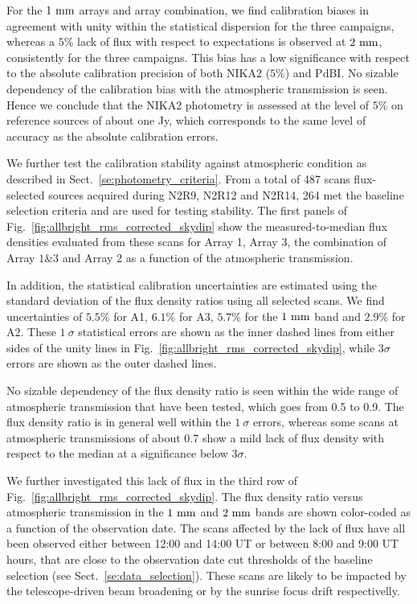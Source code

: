 For the $1~\rm{mm}$ arrays and array combination, we find calibration
biases in agreement with unity within the statistical dispersion for
the three campaigns, whereas a $5\%$ lack of flux with respect to
expectations is observed at $2~\rm{mm}$, consistently for the three
campaigns. This bias has a low significance with respect to the
absolute calibration precision of both NIKA2 ($5\%$) and PdBI.
No sizable dependency of the calibration bias with the
atmospheric transmission is seen. Hence we conclude that the NIKA2
photometry is assessed at the level of $5\%$ on reference sources of
about one Jy, which corresponds to the same level of accuracy as the
absolute calibration errors.   

We further test the calibration
stability against atmospheric condition as described in
Sect.~\ref{se:photometry_criteria}. From a total of 487 scans
flux-selected sources acquired during N2R9, N2R12 and N2R14, 264 met
the baseline selection criteria and are used for testing stability.
The first panels of Fig.~\ref{fig:allbright_rms_corrected_skydip} show the
measured-to-median flux densities evaluated from these scans for Array
1, Array 3, the combination of Array $1\&3$ and Array 2 as a function of the
atmospheric transmission.

In addition, the statistical calibration uncertainties are
estimated using the standard deviation of the flux density ratios
using all selected scans. We find uncertainties of $5.5\%$ for A1,
$6.1\%$ for A3, $5.7\%$ for the $1~\rm{mm}$ band and $2.9\%$ for A2.
These $1~\sigma$ statistical
errors are shown as the inner dashed lines from either sides of the
unity lines in Fig.~\ref{fig:allbright_rms_corrected_skydip}, while
$3\sigma$ errors are shown as the outer dashed lines.

No sizable dependency of the flux density ratio is seen within the
wide range of atmospheric transmission that have been tested, which goes
from 0.5 to 0.9. 
The flux density ratio is in general well within the $1~\sigma$ errors, whereas
some scans at atmospheric transmissions of about 0.7 show a mild lack
of flux density with respect to the median at a significance below
$3\sigma$.

We further investigated this lack of flux in the third row of
Fig.~\ref{fig:allbright_rms_corrected_skydip}. The flux density ratio
versus atmospheric transmission in the $1~\rm{mm}$ and $2~\rm{mm}$
bands are shown color-coded as a function of the observation date. The
scans affected by the lack of flux have all been observed 
either between 12:00 and 14:00 UT or between 8:00 and 9:00 UT hours,
that are close to the observation date cut thresholds of the baseline
selection (see Sect.~\ref{se:data_selection}). These scans are likely
to be impacted by the telescope-driven beam broadening or by the
sunrise focus drift respectivelly.

